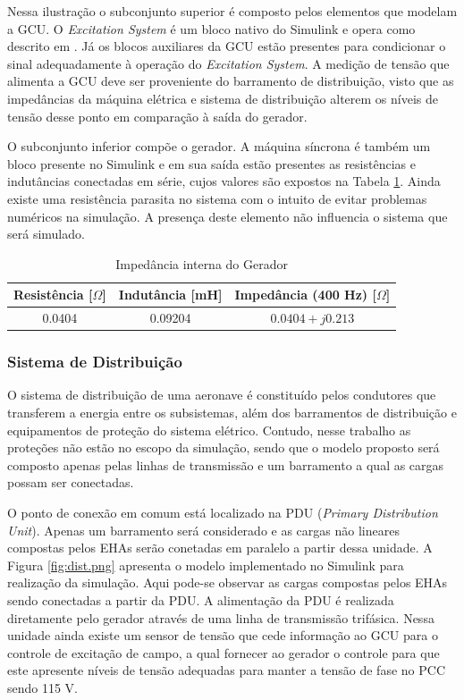 Nessa ilustração o subconjunto superior é composto pelos elementos que modelam a GCU. O \textit{Excitation System} é um bloco nativo do Simulink e opera como descrito em \cite{IEEE}. Já os blocos auxiliares da GCU estão presentes para condicionar o sinal adequadamente à operação do \textit{Excitation System}. A medição de tensão que alimenta a GCU deve ser proveniente do barramento de distribuição, visto que as impedâncias da máquina elétrica e sistema de distribuição alterem os níveis de tensão desse ponto em comparação à saída do gerador.

O subconjunto inferior compõe o gerador. A máquina síncrona é também um bloco presente no Simulink e em sua saída estão presentes as resistências e indutâncias conectadas em série, cujos valores são expostos na Tabela \ref{tab:Zgen}.  Ainda existe uma resistência parasita no sistema com o intuito de evitar problemas numéricos na simulação. A presença deste elemento não influencia o sistema que será simulado.

\begin{table}[!htb]
	\centering
	\begin{tabular}{|c|c|c|}
		\hline
		\textbf{Resistência	[$\Omega$]}	& \textbf{Indutância [mH]}	& \textbf{Impedância (400 Hz) [$\Omega$]}\\\hline
		0.0404					& 0.09204			& $0.0404+j0.213$\\
		\hline
	\end{tabular}
	\caption{Impedância interna do Gerador}
	\label{tab:Zgen}
\end{table}

\subsubsection{Sistema de Distribuição}

O sistema de distribuição de uma aeronave é constituído pelos condutores que transferem a energia entre os subsistemas, além dos barramentos de distribuição e equipamentos de proteção do sistema elétrico. Contudo, nesse trabalho as proteções não estão no escopo da simulação, sendo que o modelo proposto será composto apenas pelas linhas de transmissão e um barramento a qual as cargas possam ser conectadas.

O ponto de conexão em comum está localizado na PDU (\textit{Primary Distribution Unit}). Apenas um barramento será considerado e as cargas não lineares compostas pelos EHAs serão conetadas em paralelo a partir dessa unidade. A Figura \ref{fig:dist.png} apresenta o modelo implementado no Simulink para realização da simulação. Aqui pode-se observar as cargas compostas pelos EHAs sendo conectadas a partir da PDU. A alimentação da PDU é realizada diretamente pelo gerador através de uma linha de transmissão trifásica. Nessa unidade ainda existe um sensor de tensão que cede informação ao GCU para o controle de excitação de campo, a qual fornecer ao gerador o controle para que este apresente níveis de tensão adequadas para manter a tensão de fase no PCC sendo 115 V.


